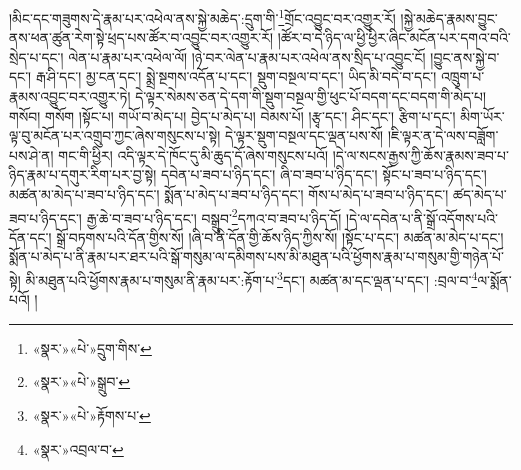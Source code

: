 །མིང་དང་གཟུགས་དེ་རྣམ་པར་འཕེལ་ནས་སྐྱེ་མཆེད་:དྲུག་གི་\footnote{«སྣར་»«པེ་»དྲུག་གིས་}གྲོང་འབྱུང་བར་འགྱུར་རོ། །སྐྱེ་མཆེད་རྣམས་བྱུང་ནས་ཕན་ཚུན་རེག་སྟེ་ཕྲད་པས་ཚོར་བ་འབྱུང་བར་འགྱུར་རོ། །ཚོར་བ་དེ་ཉིད་ལ་ཕྱི་ཕྱིར་ཞིང་མངོན་པར་དགའ་བའི་སྲེད་པ་དང་། ལེན་པ་རྣམ་པར་འཕེལ་ལོ། །ཉེ་བར་ལེན་པ་རྣམ་པར་འཕེལ་ནས་སྲིད་པ་འབྱུང་ངོ། །བྱུང་ནས་སྐྱེ་བ་དང་། རྒ་ཤི་དང་། མྱ་ངན་དང་། སྨྲེ་སྔགས་འདོན་པ་དང་། སྡུག་བསྔལ་བ་དང་། ཡིད་མི་བདེ་བ་དང་། འཁྲུག་པ་རྣམས་འབྱུང་བར་འགྱུར་ཏེ། དེ་ལྟར་སེམས་ཅན་དེ་དག་གི་སྡུག་བསྔལ་གྱི་ཕུང་པོ་བདག་དང་བདག་གི་མེད་པ། གསོབ། གསོག །སྟོང་པ། གཡོ་བ་མེད་པ། བྱེད་པ་མེད་པ། བེམས་པོ། །རྩྭ་དང་། ཤིང་དང་། རྩིག་པ་དང་། མིག་ཡོར་ལྟ་བུ་མངོན་པར་འགྲུབ་ཀྱང་ཞེས་གསུངས་པ་སྟེ། དེ་ལྟར་སྡུག་བསྔལ་དང་ལྡན་པས་སོ། །ཇི་ལྟར་ན་དེ་ལས་བཟློག་པས་ཤེ་ན། གང་གི་ཕྱིར། འདི་ལྟར་དེ་ཁོང་དུ་མི་ཆུད་དོ་ཞེས་གསུངས་པའོ། །དེ་ལ་སངས་རྒྱས་ཀྱི་ཆོས་རྣམས་ཟབ་པ་ཉིད་རྣམ་པ་དགུར་རིག་པར་བྱ་སྟེ། དབེན་པ་ཟབ་པ་ཉིད་དང་། ཞི་བ་ཟབ་པ་ཉིད་དང་། སྟོང་པ་ཟབ་པ་ཉིད་དང་། མཚན་མ་མེད་པ་ཟབ་པ་ཉིད་དང་། སྨོན་པ་མེད་པ་ཟབ་པ་ཉིད་དང་། གོས་པ་མེད་པ་ཟབ་པ་ཉིད་དང་། ཚད་མེད་པ་ཟབ་པ་ཉིད་དང་། རྒྱ་ཆེ་བ་ཟབ་པ་ཉིད་དང་། བསྒྲུབ་\footnote{«སྣར་»«པེ་»སྒྲུབ་}དཀའ་བ་ཟབ་པ་ཉིད་དོ། །དེ་ལ་དབེན་པ་ནི་སྒྲོ་འདོགས་པའི་དོན་དང་། སྒྲོ་བཏགས་པའི་དོན་གྱིས་སོ། །ཞི་བ་ནི་དོན་གྱི་ཆོས་ཉིད་ཀྱིས་སོ། །སྟོང་པ་དང་། མཚན་མ་མེད་པ་དང་། སྨོན་པ་མེད་པ་ནི་རྣམ་པར་ཐར་པའི་སྒོ་གསུམ་ལ་དམིགས་པས་མི་མཐུན་པའི་ཕྱོགས་རྣམ་པ་གསུམ་གྱི་གཉེན་པོ་སྟེ། མི་མཐུན་པའི་ཕྱོགས་རྣམ་པ་གསུམ་ནི་རྣམ་པར་:རྟོག་པ་\footnote{«སྣར་»«པེ་»རྟོགས་པ་}དང་། མཚན་མ་དང་ལྡན་པ་དང་། :བྲལ་བ་\footnote{«སྣར་»འབྲལ་བ་}ལ་སྨོན་པའོ། །
